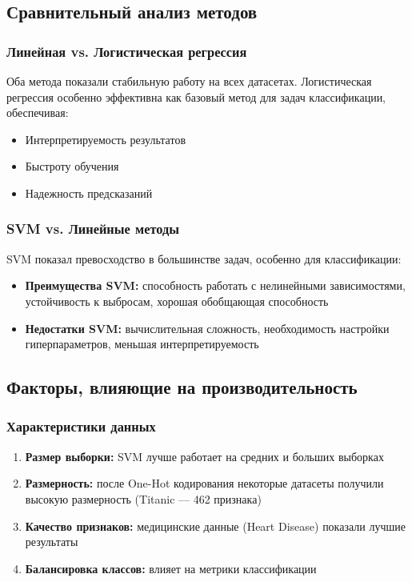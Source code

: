 \documentclass[a4paper]{article}
\begin{document}
\subsection{Сравнительный анализ методов}

\subsubsection{Линейная vs. Логистическая регрессия}
Оба метода показали стабильную работу на всех датасетах. Логистическая регрессия особенно эффективна как базовый метод для задач классификации, обеспечивая:
\begin{itemize}
    \item Интерпретируемость результатов
    \item Быстроту обучения
    \item Надежность предсказаний
\end{itemize}

\subsubsection{SVM vs. Линейные методы}
SVM показал превосходство в большинстве задач, особенно для классификации:
\begin{itemize}
    \item \textbf{Преимущества SVM:} способность работать с нелинейными зависимостями, устойчивость к выбросам, хорошая обобщающая способность
    \item \textbf{Недостатки SVM:} вычислительная сложность, необходимость настройки гиперпараметров, меньшая интерпретируемость
\end{itemize}

\subsection{Факторы, влияющие на производительность}

\subsubsection{Характеристики данных}
\begin{enumerate}
    \item \textbf{Размер выборки:} SVM лучше работает на средних и больших выборках
    \item \textbf{Размерность:} после One-Hot кодирования некоторые датасеты получили высокую размерность (Titanic — 462 признака)
    \item \textbf{Качество признаков:} медицинские данные (Heart Disease) показали лучшие результаты
    \item \textbf{Балансировка классов:} влияет на метрики классификации
\end{enumerate}
\end{document}
